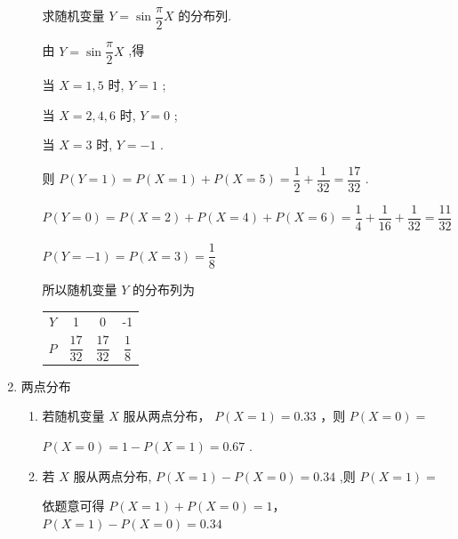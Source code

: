 \begin{enumerate}
\begin{enumerate}
\begin{center}
        \end{center}

        求随机变量 $Y = \sin \dfrac{\pi }{2}X$ 的分布列.
        \begin{jieda}
            由 $Y = \sin \dfrac{\pi }{2}X$ ,得
            
            当 $X = 1,5$ 时, $Y = 1$ ;
            
            当 $X = 2,4,6$ 时, $Y = 0$ ;
            
            当 $X = 3$ 时, $Y =  - 1$ .
            
            则 $P\left( {Y = 1}\right)  = P\left( {X = 1}\right)  + P\left( {X = 5}\right)  = \dfrac{1}{2} + \dfrac{1}{32} = \dfrac{17}{32}$ .
            
            $P\left( {Y = 0}\right)  = P\left( {X = 2}\right)  + P\left( {X = 4}\right)  + P\left( {X = 6}\right)  = \dfrac{1}{4} + \dfrac{1}{16} + \dfrac{1}{32} = \dfrac{11}{32}$
            
            $P\left( {Y =  - 1}\right)  = P\left( {X = 3}\right) = \dfrac{1}{8}$
            
            所以随机变量 $Y$ 的分布列为
            
            \begin{center}
            
            \begin{tabular}{|c|c|c|c|}
            \hline
            $Y$ & 1 & 0 & -1 \\
            \cline{1-4}
            $P$ & $\dfrac{17}{32}$ & $\dfrac{17}{32}$ & $\dfrac{1}{8}$ \\
            \cline{1-4}
            \hline
            \end{tabular}
            
            \end{center}
        \end{jieda}
    \end{enumerate}

    \item 两点分布
    \begin{enumerate}
        \item 若随机变量 $X$ 服从两点分布， $P\left( {X = 1}\right)  = {0.33}$ ，则 $P\left( {X = 0}\right)  =$ 
        \begin{jieda}
            $P\left( {X = 0}\right)  = 1 - P\left( {X = 1}\right)  = {0.67}$ .
        \end{jieda}
        \item 若 $X$ 服从两点分布, $P\left( {X = 1}\right)  - P\left( {X = 0}\right)  = {0.34}$ ,则 $P(X = 1) = $
        \begin{jieda}
            依题意可得 $P\left( {X = 1}\right)  + P\left( {X = 0}\right)  = 1$， $P\left( {X = 1}\right)  - P\left( {X = 0}\right)  = {0.34}$
            

\end{jieda}
\end{enumerate}
\end{enumerate}
